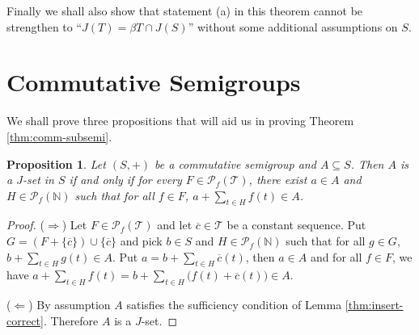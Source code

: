 \documentclass[12pt]{article}
\theoremstyle{plain}
\newtheorem{prop}[thm]{Proposition}
\theoremstyle{definition}
\newcommand{\bbN}{\mathbb{N}}
\newcommand{\calT}{\mathcal{T}}
\newcommand{\Pf}{\mathcal{P}_f}
\begin{document}
Finally we  shall also show that statement (a) in this theorem cannot be strengthen to ``$J(T) = \beta T \cap J(S)$'' without some additional assumptions on $S$. 

\section{Commutative Semigroups}

We shall prove three propositions that will aid us in proving Theorem \ref{thm:comm-subsemi}.

\begin{prop}
  \label{prop:trans-inside}
  Let $(S, +)$ be a commutative semigroup and $A \subseteq S$. 
  Then $A$ is a $J$-set in $S$ if and only if for every $F \in \Pf(\calT)$, there exist $a \in A$ and $H \in \Pf(\bbN)$ such that for all $f \in F$, $a + \sum_{t \in H} f(t) \in A$. 
\end{prop}
\begin{proof}
  ($\Rightarrow$)
  Let $F \in \Pf(\calT)$ and let $\overline{c} \in \calT$ be a
  constant sequence.
  Put $G = (F + \{\overline{c}\}) \cup \{\overline{c}\} $ and pick $b
  \in S$ and $H \in \Pf(\bbN)$ such that for all $g \in G$, $b+\sum_{t \in H} g(t) \in A$.
  Put $a = b + \sum_{t \in H} \overline{c}(t)$, then $a \in A$ and for all $f \in
  F$, we have $a + \sum_{t \in H}f(t) = b + \sum_{t \in H} 
\bigl(f(t) +
  \overline{c}(t)\bigr) \in A$.

  ($\Leftarrow$) By assumption $A$ satisfies the sufficiency condition of Lemma \ref{thm:insert-correct}.
  Therefore $A$ is a $J$-set.
\end{proof}
\end{document}
